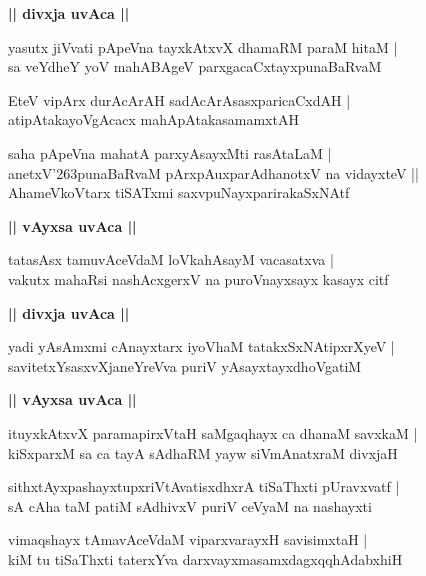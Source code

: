 \documentclass[twoside,12pt,openright]{book}
\def\S{\char'263}
\newcounter{shloka}[chapter]
\def\uvaca#1{\centerline{{\large\textbf{#1}}}}
\begin{document}
\uvaca{|| divxja uvAca ||}

\begin{shloka}%
yasutx jiVvati pApeVna tayxkAtxvX dhamaRM paraM hitaM |\\
sa veYdheY yoV mahABAgeV parxgacaCxtayxpunaBaRvaM 
\end{shloka}

\begin{shloka}%
EteV vipArx durAcArAH sadAcArAsasxparicaCxdAH |\\
atipAtakayoVgAcacx mahApAtakasamamxtAH 
\end{shloka}

\begin{shloka}%
saha pApeVna mahatA parxyAsayxMti rasAtaLaM |\\
anetxV\S punaBaRvaM pArxpAuxparAdhanotxV na vidayxteV ||\\
AhameVkoVtarx tiSATxmi saxvpuNayxparirakaSxNAtf 
\end{shloka}

\uvaca{|| vAyxsa uvAca ||}

\begin{shloka}%
tatasAsx tamuvAceVdaM loVkahAsayM vacasatxva |\\
vakutx mahaRsi nashAcxgerxV na puroVnayxsayx kasayx citf
\end{shloka}

\uvaca{|| divxja uvAca ||}

\begin{shloka}%
yadi yAsAmxmi cAnayxtarx iyoVhaM tatakxSxNAtipxrXyeV |\\
savitetxYsasxvXjaneYreVva puriV yAsayxtayxdhoVgatiM 
\end{shloka}

\uvaca{|| vAyxsa uvAca ||}

\begin{shloka}%
ituyxkAtxvX paramapirxVtaH saMgaqhayx ca dhanaM savxkaM |\\
kiSxparxM sa ca tayA sAdhaRM yayw siVmAnatxraM divxjaH 
\end{shloka}

\begin{shloka}%
sithxtAyxpashayxtupxriVtAvatisxdhxrA tiSaThxti pUravxvatf |\\
sA cAha taM patiM sAdhivxV puriV ceVyaM na nashayxti 
\end{shloka}

\begin{shloka}%
vimaqshayx tAmavAceVdaM viparxvarayxH savisimxtaH |\\
kiM tu tiSaThxti taterxYva darxvayxmasamxdagxqqhAdabxhiH
\end{shloka}
\end{document}
